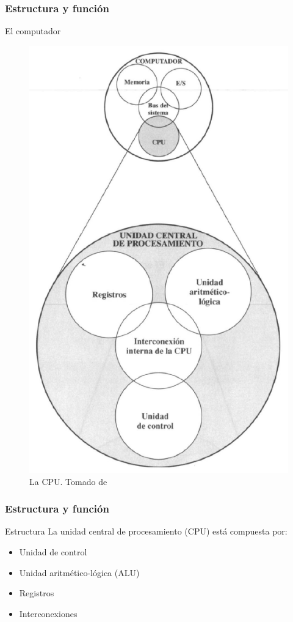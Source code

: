 \documentclass{beamer}
\begin{document}
	\begin{frame}
 		\frametitle{Estructura y función}
		\begin{block}{El computador}
\begin{figure}[H]
\centering
\includegraphics[scale=0.25]{imagenes/pc10.png}
\caption{La CPU. Tomado de \cite{stallings}}
\end{figure}
		\end{block}
	\end{frame}
	\begin{frame}
 		\frametitle{Estructura y función}
		\begin{block}{Estructura}
		La unidad central de procesamiento (CPU) está compuesta por:
		\begin{itemize}
			\item Unidad de control
			\item Unidad aritmético-lógica (ALU)
			\item Registros
			\item Interconexiones
		\end{itemize}
		\end{block}
	\end{frame}
	
\end{document}
